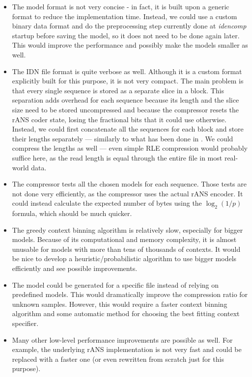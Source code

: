 \begin{itemize}
    \item The model format is not very concise - in fact, it is built upon a
    generic format to reduce the implementation time.
    Instead, we could use a custom binary data format and do the
    preprocessing step currently done at \emph{idencomp} startup before
    saving the model, so it does not need to be done again later.
    This would improve the performance and possibly make the models smaller
    as well.
    \item The IDN file format is quite verbose as well.
    Although it is a custom format explicitly built for this purpose, it is
    not very compact.
    The main problem is that every single sequence is stored as a separate
    slice in a block.
    This separation adds overhead for each sequence because its length and
    the slice size need to be stored uncompressed and because the compressor
    resets the rANS coder state, losing the fractional bits that it could use
    otherwise.
    Instead, we could first concatenate all the sequences for each block and
    store their lengths separately --- similarly to what has been done in
    .
    We could compress the lengths as well --- even simple
    RLE\cite{Salomon2007-bj} compression would probably suffice here, as
    the read length is equal through the entire file in most real-world data.
    \item The compressor tests all the chosen models for each sequence.
    Those tests are not done very efficiently, as the compressor uses the
    actual rANS encoder.
    It could instead calculate the expected number of bytes using the
    \(\log_2(1/p)\) formula, which should be much quicker.
    \item The greedy context binning algorithm is relatively slow, especially
    for bigger models.
    Because of its computational and memory complexity, it is almost unusable
    for models with more than tens of thousands of contexts.
    It would be nice to develop a heuristic/probabilistic algorithm to use
    bigger models efficiently and see possible improvements.
    \item The model could be generated for a specific file instead of relying
    on predefined models.
    This would dramatically improve the compression ratio for unknown samples.
    However, this would require a faster context binning algorithm and some
    automatic method for choosing the best fitting context specifier.
    \item Many other low-level performance improvements are possible as well.
    For example, the underlying rANS implementation is not very fast and
    could be replaced with a faster one (or even rewritten from scratch just
    for this purpose).
\end{itemize}
